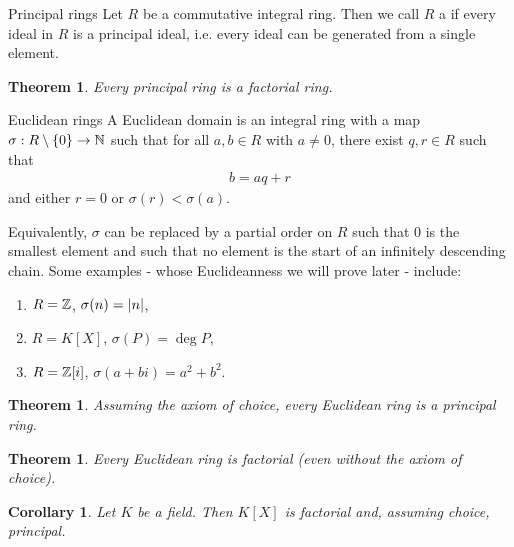\documentclass[10pt]{report}
\newtheorem{theorem}[lemma]{Theorem}
\newtheorem{corollary}[lemma]{Corollary}
\theoremstyle{definition}
\begin{document}
	\begin{importantdefinition}{Principal rings}{}
		Let $R$ be a commutative integral ring. Then we call $R$ a  if every ideal in $R$ is a principal ideal, i.e. every ideal can be generated from a single element.
	\end{importantdefinition}
	\begin{theorem}
		Every principal ring is a factorial ring.
	\end{theorem}
	\begin{importantdefinition}{Euclidean rings}{}
		A Euclidean domain is an integral ring with a map $\sigma : R \setminus \qty{0} \to \mathbb{N}$ such that for all $a,b \in R$ with $a \neq 0$, there exist $q,r \in R$ such that
		\begin{align*}
			b = aq +r
		\end{align*}
		and either $r = 0$ or $\sigma(r) < \sigma(a)$.
	\end{importantdefinition}
	Equivalently, $\sigma$ can be replaced by a partial order on $R$ such that $0$ is the smallest element and such that no element is the start of an infinitely descending chain. 
	\newpar
	Some examples - whose Euclideanness we will prove later - include:
	\begin{enumerate}
		\item $R = \mathbb{Z}$, $\sigma(n) = \abs{n}$,
		\item $R = K[X]$, $\sigma(P) = \deg P$,
		\item $R = \mathbb{Z}[i]$, $\sigma(a + bi) = a^2 + b^2$.
	\end{enumerate}
	\begin{theorem}
		Assuming the axiom of choice, every Euclidean ring is a principal ring.
	\end{theorem}
	\begin{theorem}
		Every Euclidean ring is factorial (even without the axiom of choice).
	\end{theorem}
	\begin{corollary}
		Let $K$ be a field. Then $K[X]$ is factorial and, assuming choice, principal.
	\end{corollary}
	\clearpage
\end{document}
